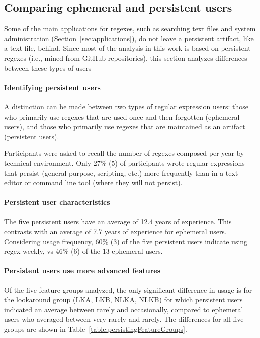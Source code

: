 \subsection{Comparing ephemeral and persistent users}
Some of the main applications for regexes, such as searching text files and system administration (Section~\ref{sec:applications}), do not leave a persistent artifact, like a text file, behind.  Since most of the analysis in this work is based on persistent regexes (i.e., mined from GitHub repositories), this section analyzes differences between these types of users

\paragraph{Identifying persistent users} A distinction can be made between two types of regular expression users: those who primarily use regexes that are used once and then forgotten (ephemeral users), and those who primarily use regexes that are maintained as an artifact (persistent users).

Participants were asked to recall the number of regexes composed per year by technical environment. Only 27\% (5)
of participants wrote regular expressions that persist (general purpose, scripting, etc.) more frequently than in a text editor or command line tool (where they will not persist).

\paragraph{Persistent user characteristics} The five persistent users have an average of 12.4 years of experience.  This contrasts with an average of 7.7 years of experience for ephemeral users.  Considering usage frequency, 60\% (3) of the five persistent users indicate using regex weekly, vs 46\% (6) of the 13 ephemeral users.





\paragraph{Persistent users use more advanced features} Of the five feature groups analyzed, the only significant difference in usage is for the lookaround group (LKA, LKB, NLKA, NLKB) for which persistent users indicated an average between rarely and occasionally, compared to ephemeral users who averaged between very rarely and rarely.  The differences for all five groups are shown in Table~\ref{table:persistingFeatureGroups}.

